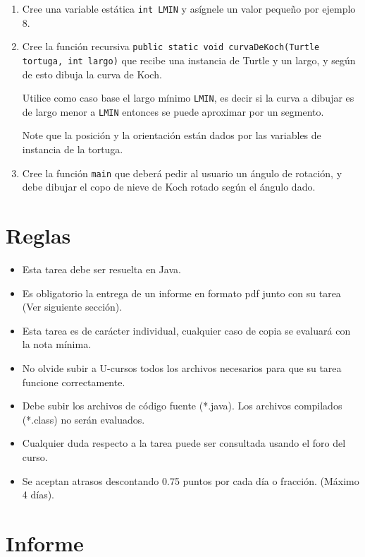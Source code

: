 \documentclass[dcc]{fcfmcourse}
\begin{document}
\begin{enumerate}
    \item Cree una variable estática \texttt{int LMIN} y asígnele un valor pequeño por ejemplo 8.

    \item Cree la función recursiva \texttt{public static void curvaDeKoch(Turtle tortuga, int largo)} que recibe una instancia de Turtle y un largo, y según de esto dibuja la curva de Koch. 
    
    Utilice como caso base el largo mínimo \texttt{LMIN}, es decir si la curva a dibujar es de largo menor a \texttt{LMIN} entonces se puede aproximar por un segmento. 
    
    Note que la posición y la orientación están dados por las variables de instancia de la tortuga.
    
    \item Cree la función \texttt{main} que deberá pedir al usuario un ángulo de rotación, y debe dibujar el copo de nieve de Koch rotado según el ángulo dado.
\end{enumerate}

\newpage
\section{Reglas}

\begin{itemize}
    \item Esta tarea debe ser resuelta en Java.
    \item Es obligatorio la entrega de un informe en formato pdf junto con su tarea (Ver siguiente sección).
    \item Esta tarea es de carácter individual, cualquier caso de copia se evaluará con la nota mínima.
    \item No olvide subir a U-cursos todos los archivos necesarios para que su tarea funcione correctamente.
    \item Debe subir los archivos de código fuente (*.java). Los archivos compilados (*.class) no serán evaluados.
    \item Cualquier duda respecto a la tarea puede ser consultada usando el foro del curso.
    \item Se aceptan atrasos descontando 0.75 puntos por cada día o fracción. (Máximo 4 días).
\end{itemize}

\section{Informe}
\end{document}
